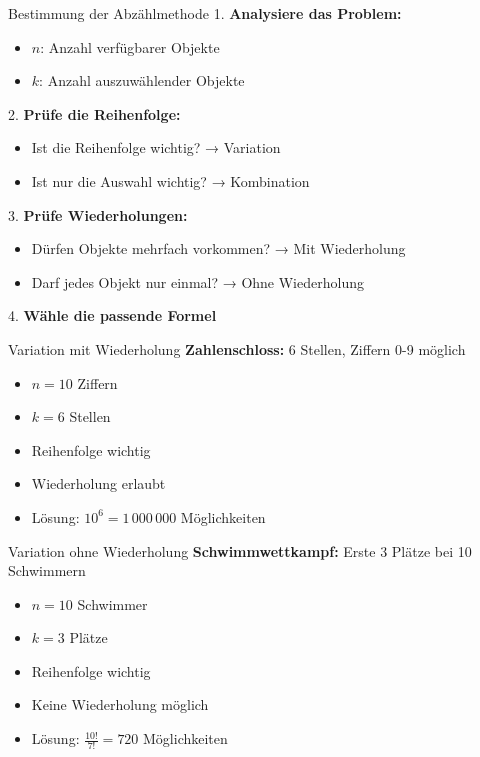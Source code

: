 \begin{KR}{Bestimmung der Abzählmethode}
1. \textbf{Analysiere das Problem:}
   \begin{itemize}
   \item $n$: Anzahl verfügbarer Objekte
   \item $k$: Anzahl auszuwählender Objekte
   \end{itemize}

2. \textbf{Prüfe die Reihenfolge:}
   \begin{itemize}
   \item Ist die Reihenfolge wichtig? → Variation
   \item Ist nur die Auswahl wichtig? → Kombination
   \end{itemize}

3. \textbf{Prüfe Wiederholungen:}
   \begin{itemize}
   \item Dürfen Objekte mehrfach vorkommen? → Mit Wiederholung
   \item Darf jedes Objekt nur einmal? → Ohne Wiederholung
   \end{itemize}

4. \textbf{Wähle die passende Formel}
\end{KR}

\begin{example2}{Variation mit Wiederholung}
\textbf{Zahlenschloss:} 6 Stellen, Ziffern 0-9 möglich
\begin{itemize}
    \item $n=10$ Ziffern
    \item $k=6$ Stellen
    \item Reihenfolge wichtig
    \item Wiederholung erlaubt
    \item Lösung: $10^6 = 1\,000\,000$ Möglichkeiten
\end{itemize}
\end{example2}

\begin{example2}{Variation ohne Wiederholung}
\textbf{Schwimmwettkampf:} Erste 3 Plätze bei 10 Schwimmern
\begin{itemize}
    \item $n=10$ Schwimmer
    \item $k=3$ Plätze
    \item Reihenfolge wichtig
    \item Keine Wiederholung möglich
    \item Lösung: $\frac{10!}{7!} = 720$ Möglichkeiten
\end{itemize}
\end{example2}

